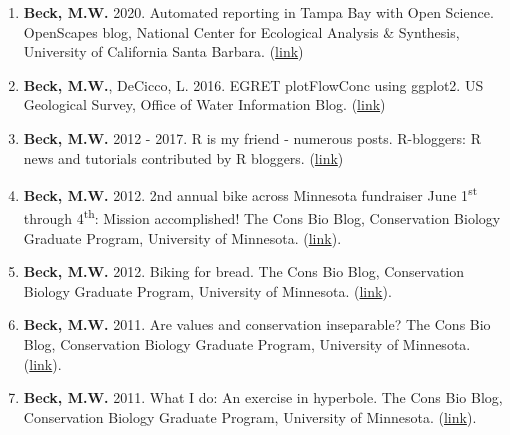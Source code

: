 \documentclass[letterpaper,12pt]{article}
\begin{document}
\begin{enumerate}

\item \textbf{Beck, M.W.} 2020. Automated reporting in Tampa Bay with Open Science. OpenScapes blog, National Center for Ecological Analysis \& Synthesis, University of California Santa Barbara. ({\footnotesize\href{https://www.openscapes.org/blog/2020/11/16/tampa-bay-reporting/}{link}}) 

\item \textbf{Beck, M.W.}, DeCicco, L. 2016. EGRET plotFlowConc using ggplot2. US Geological Survey, Office of Water Information Blog. ({\footnotesize\href{https://owi.usgs.gov/blog/plotFlowConc/}{link}})

\item \textbf{Beck, M.W.} 2012 - 2017. R is my friend - numerous posts. R-bloggers: R news and tutorials contributed by R bloggers. ({\footnotesize\href{https://beckmw.wordpress.com/}{link}})

\item \textbf{Beck, M.W.} 2012. 2nd annual bike across Minnesota fundraiser June 1\textsuperscript{st} through 4\textsuperscript{th}: Mission accomplished! The Cons Bio Blog, Conservation Biology Graduate Program, University of Minnesota. ({\footnotesize\href{https://consbioumn.wordpress.com/2012/06/25/2nd-annual-bike-across-minnesota-fundraiser-june-1st-through-4th-mission-accomplished/}{link}}).

\item \textbf{Beck, M.W.} 2012. Biking for bread. The Cons Bio Blog, Conservation Biology Graduate Program, University of Minnesota. ({\footnotesize\href{https://consbioumn.wordpress.com/2012/05/01/biking-for-bread/}{link}}).

\item \textbf{Beck, M.W.} 2011. Are values and conservation inseparable? The Cons Bio Blog, Conservation Biology Graduate Program, University of Minnesota. ({\footnotesize\href{https://consbioumn.wordpress.com/2011/09/21/are-values-and-conservation-inseparable/}{link}}).

\item \textbf{Beck, M.W.} 2011. What I do: An exercise in hyperbole. The Cons Bio Blog, Conservation Biology Graduate Program, University of Minnesota. ({\footnotesize\href{https://consbioumn.wordpress.com/2011/02/15/what-i-do-an-exercise-in-hyperbole/}{link}}).

\end{enumerate}
\end{document}

